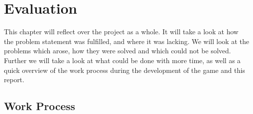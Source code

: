 \chapter{Evaluation}
This chapter will reflect over the project as a whole. It will take a look at how the problem statement was fulfilled, and where it was lacking. We will look at the problems which arose, how they were solved and which could not be solved. Further we will take a look at what could be done with more time, as well as a quick overview of the work process during the development of the game and this report.

\section{Work Process}

